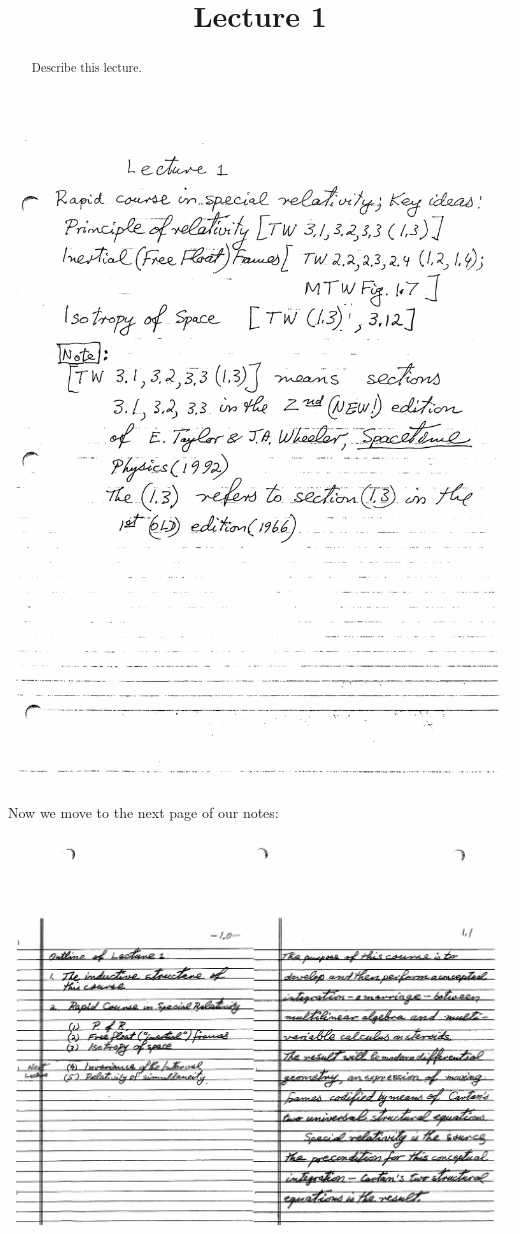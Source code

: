 \documentclass{ximera}
\title{Lecture 1}
\begin{document}
\begin{abstract}
Describe this lecture.
\end{abstract}
\maketitle



\begin{image}
\includegraphics{lecture01-01.pdf}
\end{image}

Now we move to the next page of our notes:

\begin{image}
\includegraphics{lecture01-02.pdf}
\end{image}
\end{document}
